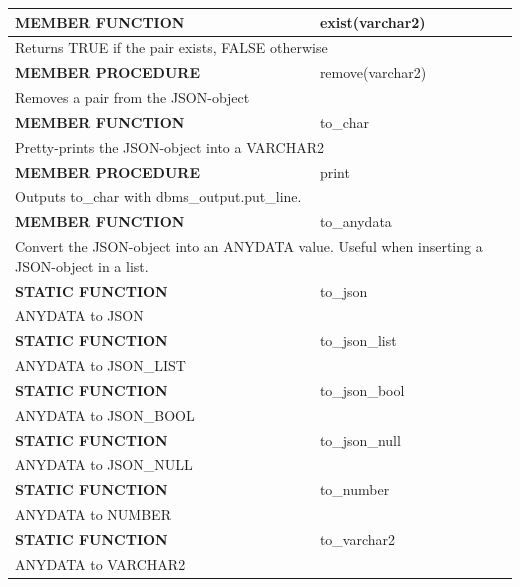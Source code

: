 \documentclass[11pt,twocolumn, a4paper]{article}
\begin{document}
\begin{longtable}{| l | l |}
\hline
  \textbf{MEMBER FUNCTION} & exist(varchar2)\\
\hline
  \multicolumn{2}{|p{15cm}|}{Returns TRUE if the pair exists, FALSE otherwise} \\
\hline

\hline
  \textbf{MEMBER PROCEDURE} & remove(varchar2)\\
\hline
  \multicolumn{2}{|p{15cm}|}{Removes a pair from the JSON-object} \\
\hline

\hline
  \textbf{MEMBER FUNCTION} & to\_char\\
\hline
  \multicolumn{2}{|p{15cm}|}{Pretty-prints the JSON-object into a VARCHAR2} \\
\hline

\hline
  \textbf{MEMBER PROCEDURE} & print\\
\hline
  \multicolumn{2}{|p{15cm}|}{Outputs to\_char with dbms\_output.put\_line.} \\
\hline

\hline
  \textbf{MEMBER FUNCTION} & to\_anydata\\
\hline
  \multicolumn{2}{|p{15cm}|}{Convert the JSON-object into an ANYDATA value. Useful when inserting a JSON-object in a list.} \\
\hline

\hline
  \textbf{STATIC FUNCTION} & to\_json\\
\hline
  \multicolumn{2}{|p{15cm}|}{ANYDATA to JSON} \\
\hline
\hline
  \textbf{STATIC FUNCTION} & to\_json\_list\\
\hline
  \multicolumn{2}{|p{15cm}|}{ANYDATA to JSON\_LIST} \\
\hline
\hline
  \textbf{STATIC FUNCTION} & to\_json\_bool\\
\hline
  \multicolumn{2}{|p{15cm}|}{ANYDATA to JSON\_BOOL} \\
\hline
\hline
  \textbf{STATIC FUNCTION} & to\_json\_null\\
\hline
  \multicolumn{2}{|p{15cm}|}{ANYDATA to JSON\_NULL} \\
\hline
\hline
  \textbf{STATIC FUNCTION} & to\_number\\
\hline
  \multicolumn{2}{|p{15cm}|}{ANYDATA to NUMBER} \\
\hline
\hline
  \textbf{STATIC FUNCTION} & to\_varchar2\\
\hline
  \multicolumn{2}{|p{15cm}|}{ANYDATA to VARCHAR2} \\
\hline

\end{longtable}
\end{document}
